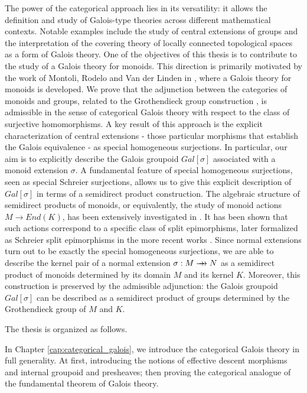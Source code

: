 \medskip

The power of the categorical approach lies in its versatility: it allows the definition and study of Galois-type theories across different mathematical contexts. Notable examples include the study of central extensions of groups and the interpretation of the covering theory of locally connected topological spaces as a form of Galois theory. One of the objectives of this thesis is to contribute to the study of a Galois theory for monoids. This direction is primarily motivated by the work of Montoli, Rodelo and Van der Linden in \cite{montoli2014galois}, where a Galois theory for monoids is developed. We prove that the adjunction between the categories of monoids and groups, related to the Grothendieck group construction \cite{malcev1937, malcev1939immersion, malcev1940immersion}, is admissible in the sense of categorical Galois theory with respect to the class of surjective homomorphisms. A key result of this approach is the explicit characterization of central extensions - those particular morphisms that establish the Galois equivalence - as special homogeneous surjections. In particular, our aim is to explicitly describe the Galois groupoid $Gal[\sigma]$ associated with a monoid extension $\sigma$. A fundamental feature of special homogeneous surjections, seen as special Schreier surjections, allows us to give this explicit description of $Gal[\sigma]$ in terms of a semidirect product construction. The algebraic structure of semidirect products of monoids, or equivalently, the study of monoid actions $M\to End(K)$, has been extensively investigated in \cite{patchkoria1998crossed}. It has been shown that such actions correspond to a specific class of split epimorphisms, later formalized as Schreier split epimorphisms in the more recent works \cite{bourn2014schreierSemirings, bourn2014schreier, martins2013semidirect}. Since normal extensions turn out to be exactly the special homogeneous surjections, we are able to describe the kernel pair of a normal extension $\sigma:M\rrightarrow N$ as a semidirect product of monoids determined by its domain $M$ and its kernel $K$. Moreover, this construction is preserved by the admissible adjunction: the Galois groupoid $Gal[\sigma]$ can be described as a semidirect product of groups determined by the Grothendieck group of $M$ and $K$.

\medskip

The thesis is organized as follows.

\smallskip

In Chapter \ref{cap:categorical_galois}, we introduce the categorical Galois theory in full generality. At first, introducing the notions of effective descent morphisms and internal groupoid and presheaves; then proving the categorical analogue of the fundamental theorem of Galois theory. 

